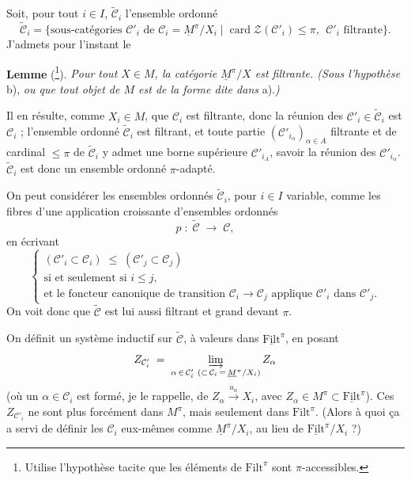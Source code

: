 
Soit, pour tout $i\in I$, $\tilde{\mathcal{C}}_i$ l'ensemble ordonné
\[ \tilde{\mathcal{C}}_i = \{\text{sous-catégories } \mathcal{C}'_i \text{ de } \mathcal{C}_i = \underline{M}^\pi/X_i \mid \operatorname{card}\mathcal{Z}(\mathcal{C}'_i)\le\pi,\ \ \mathcal{C}'_i \text{ filtrante}\}. \]
J'admets pour l'instant le

\textbf{Lemme} (\footnote{Utilise l'hypothèse tacite que les éléments de $\mathrm{Filt}^\pi$ sont $\pi$-accessibles.}). \textit{Pour tout $X\in M$, la catégorie $\underline{M}^\pi/X$ est filtrante. (Sous l'hypothèse} b), \textit{ou que tout objet de $M$ est de la forme dite dans} a).\textit{)}

Il en résulte, comme $X_i\in M$, que $\mathcal{C}_i$ est filtrante, donc la réunion des $\mathcal{C}'_i\in\tilde{\mathcal{C}}_i$ est $\mathcal{C}_i$ ; l'ensemble ordonné $\tilde{\mathcal{C}}_i$ est filtrant, et toute partie $(\mathcal{C}'_{i_\alpha})_{\alpha\in A}$ filtrante et de cardinal $\le\pi$ de $\tilde{\mathcal{C}}_i$ y admet une borne supérieure $\mathcal{C}'_{i_A}$, savoir la réunion des $\mathcal{C}'_{i_\alpha}$. $\tilde{\mathcal{C}}_i$ est donc un ensemble ordonné $\pi$-adapté.

On peut considérer les ensembles ordonnés $\tilde{\mathcal{C}}_i$, pour $i\in I$ variable, comme les fibres d'une application croissante d'ensembles ordonnés
\[ p \;:\; \tilde{\mathcal{C}} \;\longrightarrow\; \mathcal{C}, \]
en écrivant
\[ \left\{ \begin{array}{l}
(\mathcal{C}'_i\subset\mathcal{C}_i) \;\le\; (\mathcal{C}'_j\subset\mathcal{C}_j) \\
\text{si et seulement si } i\le j, \\
\text{et le foncteur canonique de transition } \mathcal{C}_i\longrightarrow\mathcal{C}_j \text{ applique } \mathcal{C}'_i \text{ dans } \mathcal{C}'_j.
\end{array}\right. \]
On voit donc que $\tilde{\mathcal{C}}$ est lui aussi filtrant et grand devant $\pi$.

On définit un système inductif sur $\tilde{\mathcal{C}}$, à valeurs dans $\underline{\mathrm{Filt}}^\pi$, en posant
\[ Z_{\mathcal{C}'_i} \;=\; \varinjlim_{\alpha\,\in\,\mathcal{C}'_i\ (\subset\,\mathcal{C}_i\,=\,\underline{M}^\pi/X_i)} Z_\alpha \]
(où un $\alpha\in\mathcal{C}_i$ est formé, je le rappelle, de $Z_\alpha\xrightarrow{u_\alpha}X_i$, avec $Z_\alpha\in M^\pi\subset\underline{\mathrm{Filt}}^\pi$). Ces $Z_{\mathcal{C}'_i}$ ne sont plus forcément dans $M^\pi$, mais seulement dans $\mathrm{Filt}^\pi$. (Alors à quoi ça a servi de définir les $\mathcal{C}_i$ eux-mêmes comme $\underline{M}^\pi/X_i$, au lieu de $\underline{\mathrm{Filt}}^\pi/X_i$ ?)

